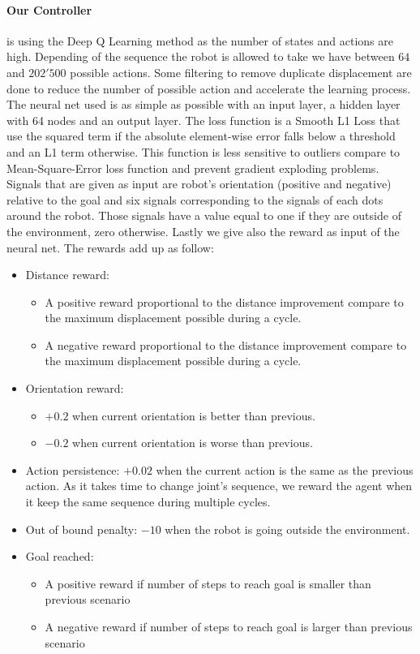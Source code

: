         \paragraph{Our Controller} is using the Deep Q Learning method as the number of states and actions are high. Depending of the sequence the robot is allowed to take we have between $64$ and $202'500$ possible actions. Some filtering to remove duplicate displacement are done to reduce the number of possible action and accelerate the learning process. The neural net used is as simple as possible with an input layer, a hidden layer with 64 nodes and an output layer. The loss function is a Smooth L1 Loss that use the squared term if the absolute element-wise error falls below a threshold and an L1 term otherwise. This function is less sensitive to outliers compare to Mean-Square-Error loss function and prevent gradient exploding problems.
        Signals that are given as input are robot's orientation (positive and negative) relative to the goal and six signals corresponding to the signals of each dots around the robot. Those signals have a value equal to one if they are outside of the environment, zero otherwise. Lastly we give also the reward as input of the neural net. The rewards add up as follow:
        \begin{itemize}
            \item Distance reward:
            \begin{itemize}
                \item A positive reward proportional to the distance improvement compare to the maximum displacement possible during a cycle.
                \item A negative reward proportional to the distance improvement compare to the maximum displacement possible during a cycle.
            \end{itemize}
            \item Orientation reward:
            \begin{itemize}
                \item $+0.2$ when current orientation is better than previous.
                \item $-0.2$ when current orientation is worse than previous.
            \end{itemize}
            \item Action persistence: $+0.02$ when the current action is the same as the previous action. As it takes time to change joint's sequence, we reward the agent when it keep the same sequence during multiple cycles.
            \item Out of bound penalty: $-10$ when the robot is going outside the environment.
            \item Goal reached:
                \begin{itemize}
                    \item A positive reward if number of steps to reach goal is smaller than previous scenario
                    \item A negative reward if number of steps to reach goal is larger than previous scenario
                \end{itemize}
        \end{itemize}
        
            
            